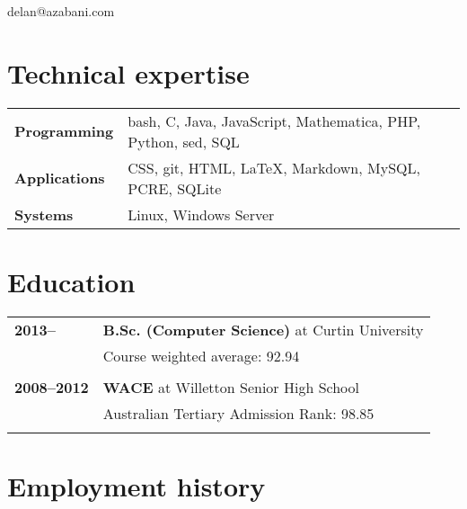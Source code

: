 \documentclass[a4paper,12pt]{article}
\begin{document}
\hrulefill

\hspace{1cm}\begin{minipage}{7cm}
	{\Huge delan\textcolor{lg}@azabani\textcolor{lg}{.com}}
\end{minipage}\hfill\begin{minipage}{4cm}
\end{minipage}\hspace{1cm}

\hrulefill

\section*{Technical expertise}

\begin{tabular}{p{3.5cm}p{12.5cm}}
	\textbf{Programming} &
		bash, C, Java, JavaScript, Mathematica, PHP, Python, sed, SQL \\
	\textbf{Applications} &
		CSS, git, HTML, \LaTeX, Markdown, MySQL, PCRE, SQLite \\
	\textbf{Systems} &
		Linux, Windows Server \\
\end{tabular}

\section*{Education}

\begin{tabular}{p{3.5cm}p{12.5cm}}
	\textbf{2013--} &
		\textbf{B.Sc. (Computer Science)} at Curtin University\\
		& Course weighted average: 92.94\\\\
	\textbf{2008--2012} &
		\textbf{WACE} at Willetton Senior High School\\
		& Australian Tertiary Admission Rank: 98.85\\\\
\end{tabular}

\section*{Employment history}
\end{document}
